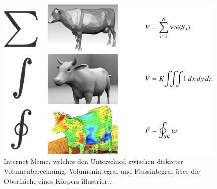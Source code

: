 %
%
%
\begin{figure}
\centering
\includegraphics{chapters/050-gauss/images/kuh.pdf}
\caption{Internet-Meme, welches den Unterschied zwischen diskreter
Volumenberechnung, Volumenintegral und Flussintegral über die
Oberfläche eines Körpers illustriert.
\label{buch:gauss:fig:kuh}}
\end{figure}
